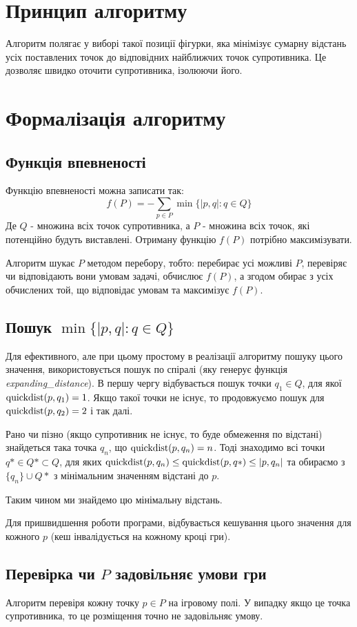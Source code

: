 \documentclass{article}
\begin{document}
\section{Принцип алгоритму}
Алгоритм полягає у виборі такої позиції фігурки, яка мінімізує сумарну відстань усіх поставлених точок до відповідних найближчих точок супротивника. Це дозволяє швидко оточити супротивника, ізолюючи його.

\section{Формалізація алгоритму}
\subsection{Функція впевненості}
Функцію впевненості можна записати так:
\[f(P) = -\sum_{p \in P}\min\{|p, q| : q\in Q\}\]
Де $Q$ - множина всіх точок супротивника, а $P$ - множина всіх точок, які потенційно будуть виставлені. Отриману функцію $f(P)$ потрібно максимізувати.

Алгоритм шукає $P$ методом перебору, тобто: перебирає усі можливі $P$, перевіряє чи відповідають вони умовам задачі, обчислює $f(P)$, а згодом обирає з усіх обчислених той, що відповідає умовам та максимізує $f(P)$.

\subsection{Пошук $\min\{|p, q| : q\in Q\}$}
Для ефективного, але при цьому простому в реалізації алгоритму пошуку цього значення, використовується пошук по спіралі (яку генерує функція \textit{expanding\_distance}). В першу чергу відбувається пошук точки $q_1 \in Q$, для якої $\operatorname{quickdist}(p, q_1) = 1$. Якщо такої точки не існує, то продовжуємо пошук для $\operatorname{quickdist}(p, q_2) = 2$ і так далі.

Рано чи пізно (якщо супротивник не існує, то буде обмеження по відстані) знайдеться така точка $q_n$, що $\operatorname{quickdist}(p, q_n) = n$. Тоді знаходимо всі точки $q* \in Q* \subset Q$, для яких $\operatorname{quickdist}(p, q_n) \leq \operatorname{quickdist}(p, q*) \leq |p, q_n|$ та обираємо з $\{q_n\} \cup Q*$ з мінімальним значенням відстані до $p$.

Таким чином ми знайдемо цю мінімальну відстань.

Для пришвидшення роботи програми, відбувається кешування цього значення для кожного $p$ (кеш інвалідується на кожному кроці гри).

\subsection{Перевірка чи $P$ задовільняє умови гри}
Алгоритм перевіря кожну точку $p \in P$ на ігровому полі. У випадку якщо це точка супротивника, то це розміщення точно не задовільняє умову.
\end{document}
